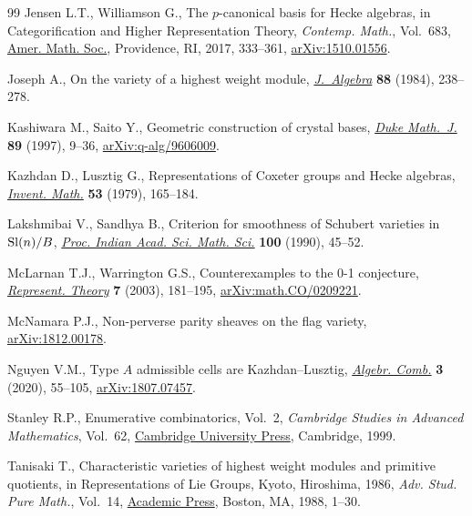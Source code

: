 \begin{thebibliography}{99}
Jensen L.T., Williamson G., The {$p$}-canonical basis for {H}ecke algebras, in
 Categorification and Higher Representation Theory, \textit{Contemp. Math.},
 Vol.~683, \href{https://doi.org/10.1090/conm/683}{Amer. Math. Soc.}, Providence, RI, 2017, 333--361,
 \href{https://arxiv.org/abs/1510.01556}{arXiv:1510.01556}.

Joseph A., On the variety of a highest weight module, \href{https://doi.org/10.1016/0021-8693(84)90100-5}{\textit{J.~Algebra}}
 \textbf{88} (1984), 238--278.

Kashiwara M., Saito Y., Geometric construction of crystal bases, \href{https://doi.org/10.1215/S0012-7094-97-08902-X}{\textit{Duke
 Math.~J.}} \textbf{89} (1997), 9--36, \href{https://arxiv.org/abs/q-alg/9606009}{arXiv:q-alg/9606009}.

Kazhdan D., Lusztig G., Representations of {C}oxeter groups and {H}ecke
 algebras, \href{https://doi.org/10.1007/BF01390031}{\textit{Invent. Math.}} \textbf{53} (1979), 165--184.

Lakshmibai V., Sandhya B., Criterion for smoothness of {S}chubert varieties in
 {${\rm Sl}(n)/B$}, \href{https://doi.org/10.1007/BF02881113}{\textit{Proc. Indian Acad. Sci. Math. Sci.}} \textbf{100}
 (1990), 45--52.

McLarnan T.J., Warrington G.S., Counterexamples to the 0-1 conjecture,
 \href{https://doi.org/10.1090/S1088-4165-03-00178-X}{\textit{Represent. Theory}} \textbf{7} (2003), 181--195,
 \href{https://arxiv.org/abs/math.CO/0209221}{arXiv:math.CO/0209221}.

McNamara P.J., Non-perverse parity sheaves on the flag variety,
 \href{https://arxiv.org/abs/1812.00178}{arXiv:1812.00178}.

Nguyen V.M., Type {$A$} admissible cells are {K}azhdan--{L}usztig,
 \href{https://doi.org/10.5802/alco.91}{\textit{Algebr. Comb.}} \textbf{3} (2020), 55--105, \href{https://arxiv.org/abs/1807.07457}{arXiv:1807.07457}.

Stanley R.P., Enumerative combinatorics, {V}ol.~2, \textit{Cambridge Studies in
 Advanced Mathematics}, Vol.~62, \href{https://doi.org/10.1017/CBO9780511609589}{Cambridge University Press}, Cambridge, 1999.

Tanisaki T., Characteristic varieties of highest weight modules and primitive
 quotients, in Representations of {L}ie Groups, {K}yoto, {H}iroshima, 1986,
 \textit{Adv. Stud. Pure Math.}, Vol.~14, \href{https://doi.org/10.2969/aspm/01410001}{Academic Press}, Boston, MA, 1988,
 1--30.


\end{thebibliography}
